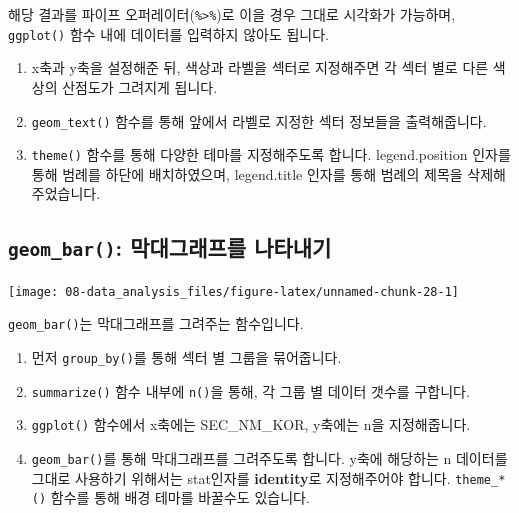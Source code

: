 \documentclass[12pt,]{book}
\newenvironment{Shaded}{\begin{snugshade}}{\end{snugshade}}
\newcommand{\DataTypeTok}[1]{\textcolor[rgb]{0.13,0.29,0.53}{#1}}
\newcommand{\KeywordTok}[1]{\textcolor[rgb]{0.13,0.29,0.53}{\textbf{#1}}}
\newcommand{\NormalTok}[1]{#1}
\newcommand{\OperatorTok}[1]{\textcolor[rgb]{0.81,0.36,0.00}{\textbf{#1}}}
\newcommand{\StringTok}[1]{\textcolor[rgb]{0.31,0.60,0.02}{#1}}
\providecommand{\tightlist}{%
  \setlength{\itemsep}{0pt}\setlength{\parskip}{0pt}}
\begin{document}
해당 결과를 파이프 오퍼레이터(\texttt{\%\textgreater{}\%})로 이을 경우 그대로 시각화가 가능하며, \texttt{ggplot()} 함수 내에 데이터를 입력하지 않아도 됩니다.

\begin{enumerate}
\def\labelenumi{\arabic{enumi}.}
\setcounter{enumi}{3}
\tightlist
\item
  x축과 y축을 설정해준 뒤, 색상과 라벨을 섹터로 지정해주면 각 섹터 별로 다른 색상의 산점도가 그려지게 됩니다.
\item
  \texttt{geom\_text()} 함수를 통해 앞에서 라벨로 지정한 섹터 정보들을 출력해줍니다.
\item
  \texttt{theme()} 함수를 통해 다양한 테마를 지정해주도록 합니다. legend.position 인자를 통해 범례를 하단에 배치하였으며, legend.title 인자를 통해 범례의 제목을 삭제해 주었습니다.
\end{enumerate}

\hypertarget{geom_bar--}{%
\subsection{\texorpdfstring{\texttt{geom\_bar()}: 막대그래프를 나타내기}{geom\_bar(): 막대그래프를 나타내기}}\label{geom_bar--}}

\begin{Shaded}
\end{Shaded}

\begin{center}\texttt{[image: 08-data\_analysis\_files/figure-latex/unnamed-chunk-28-1]} \end{center}

\texttt{geom\_bar()}는 막대그래프를 그려주는 함수입니다.

\begin{enumerate}
\def\labelenumi{\arabic{enumi}.}
\tightlist
\item
  먼저 \texttt{group\_by()}를 통해 섹터 별 그룹을 묶어줍니다.
\item
  \texttt{summarize()} 함수 내부에 \texttt{n()}을 통해, 각 그룹 별 데이터 갯수를 구합니다.
\item
  \texttt{ggplot()} 함수에서 x축에는 SEC\_NM\_KOR, y축에는 n을 지정해줍니다.
\item
  \texttt{geom\_bar()}를 통해 막대그래프를 그려주도록 합니다. y축에 해당하는 n 데이터를 그대로 사용하기 위해서는 stat인자를 \textbf{identity}로 지정해주어야 합니다. \texttt{theme\_*()} 함수를 통해 배경 테마를 바꿀수도 있습니다.
\end{enumerate}
\end{document}
